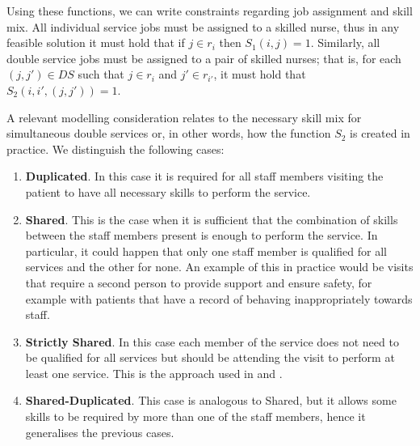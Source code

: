 \documentclass[a4paper,11pt,authoryear]{elsarticle}
\begin{document}

Using these functions, we can write constraints regarding job assignment and skill mix.
All individual service jobs must be assigned to a skilled nurse, thus in any feasible solution it must hold that if $j \in r_i$ then $S_1(i,j) = 1$. Similarly, all double service jobs must be assigned to a pair of skilled nurses; that is, for each $(j, j') \in DS$ such that $j \in r_{i}$ and $j' \in r_{i'}$, it must hold that $S_2(i, i', (j, j')) = 1$.




A relevant modelling consideration relates to the necessary skill mix for simultaneous double services or, in other words, how the function $S_2$ is created in practice. We distinguish the following cases:
\begin{enumerate}
    \item \textbf{Duplicated}. In this case it is required for all staff members visiting the patient to have all necessary skills to perform the service.
    \item \textbf{Shared}. This is the case when it is sufficient that the combination of skills between the staff members present is enough to perform the service. In particular, it could happen that only one staff member is qualified for all services and the other for none. An example of this in practice would be visits that require a second person to provide support and ensure safety, for example with patients that have a record of behaving inappropriately towards staff.
    \item \textbf{Strictly Shared}. In this case each member of the service does not need to be qualified for all services but should be attending the visit to perform at least one service. This is the approach used in \cite{mankowska2014} and \cite{aithaddadene2016}.
    \item \textbf{Shared-Duplicated}. This case is analogous to Shared, but it allows some skills to be required by more than one of the staff members, hence it generalises the previous cases.
\end{enumerate}
\end{document}
